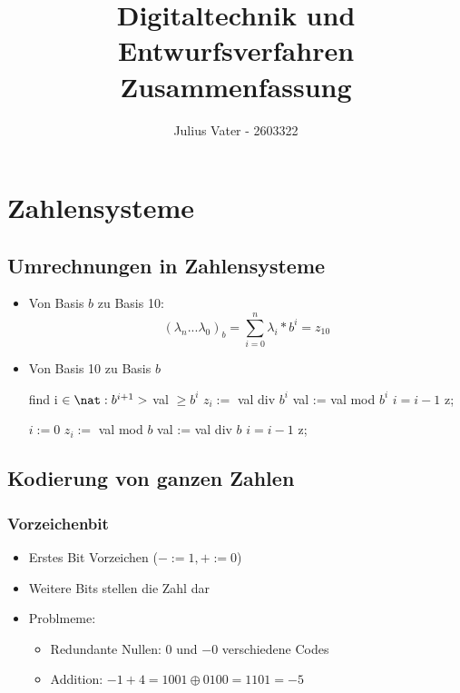 \documentclass{kit}
\author{Julius Vater - 2603322}
\title{Digitaltechnik und Entwurfsverfahren Zusammenfassung}
\begin{document}
\maketitle
\tableofcontents
\pagebreak
\section{Zahlensysteme}
  \subsection{Umrechnungen in Zahlensysteme}
    \begin{itemize}
      \item Von Basis $b$ zu Basis 10:
          $$(\lambda_n...\lambda_0)_b=\sum_{i=0}^n\lambda_i*b^i=z_{10}$$
      \item Von Basis 10 zu Basis $b$
            \begin{algorithm}
              \caption{Euklidischer Algorithmus}
              find i $\in\nat:b^{i+1}>$ val $\ge b^i$\;
              {
                $z_i:=$ val div $b^i$\;
                val := val mod $b^i$\;
                $i=i-1$\;
              }
              \Return z;
            \end{algorithm}
            \begin{algorithm}
              \caption{Horner-Shema}
              $i:=0$\;
              {
                $z_i:=$ val mod $b$\;
                val := val div $b$\;
                $i=i-1$\;
              }
              \Return z;
            \end{algorithm}
    \end{itemize}
  \newpage
  \subsection{Kodierung von ganzen Zahlen}
    \subsubsection{Vorzeichenbit}
      \begin{itemize}
        \item Erstes Bit Vorzeichen ($-:=1,+:=0$)
        \item Weitere Bits stellen die Zahl dar
        \item Problmeme:
          \begin{itemize}
            \item Redundante Nullen: $0$ und $-0$ verschiedene Codes
            \item Addition: $-1+4=1001\oplus0100=1101=-5$
          \end{itemize}
      \end{itemize}
\end{document}
